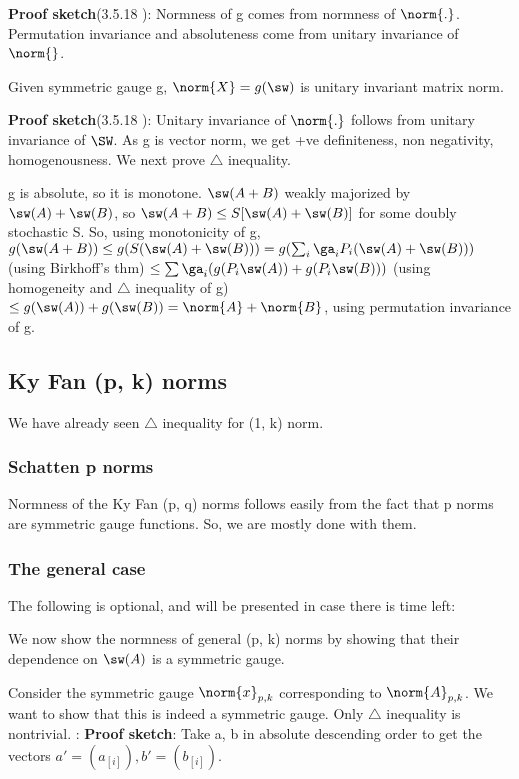 \documentclass[10pt]{amsart}
\newcommand{\proofSketch}{\textbf{Proof sketch}}
\begin{document}
\proofSketch (3.5.18 \cite{hornJohnsonTopics}): Normness of g comes from normness of $\norm{.}$. Permutation invariance and absoluteness come from unitary invariance of $\norm{}$. \finish

Given symmetric gauge g, $\norm{X} = g(\sw)$ is unitary invariant matrix norm.

\proofSketch (3.5.18 \cite{hornJohnsonTopics}): Unitary invariance  of $\norm{.}$ follows from unitary invariance of $\SW$. As g is vector norm, we get +ve definiteness, non negativity, homogenousness. We next prove $\triangle$ inequality.

g is absolute, so it is monotone. $\sw(A + B)$ weakly majorized by $\sw(A) + \sw(B)$, so $\sw(A+B) \leq S[\sw(A) + \sw(B)]$ for some doubly stochastic S. So, using monotonicity of g, $g(\sw(A+B)) \leq g(S(\sw(A)+\sw(B))) = g(\sum_{i} \ga_{i} P_{i}(\sw(A)+\sw(B)))$ (using Birkhoff's thm) $\leq \sum \ga_{i}(g(P_{i}\sw(A)) + g(P_{i}\sw(B))) $ (using homogeneity and $\triangle$ inequality of g) $\leq g(\sw(A)) + g(\sw(B)) = \norm{A} + \norm{B}$, using permutation invariance of g.

\subsection{Ky Fan (p, k) norms}
We have already seen $\triangle$ inequality for (1, k) norm.


\subsubsection{Schatten p norms}
Normness of the Ky Fan (p, q) norms follows easily from the fact that p norms are symmetric gauge functions. So, we are mostly done with them.

\subsubsection{The general case}
The following is optional, and will be presented in case there is time left:

We now show the normness of general (p, k) norms by showing that their dependence on $\sw(A)$ is a symmetric gauge.

Consider the symmetric gauge $\norm{x}_{p,k}$ corresponding to $\norm{A}_{p,k}$. We want to show that this is indeed a symmetric gauge. Only $\triangle$ inequality is nontrivial. :
\proofSketch: 
Take a, b in absolute descending order to get the vectors $a' = (a_{[i]}), b' = (b_{[i]})$.
\end{document}
